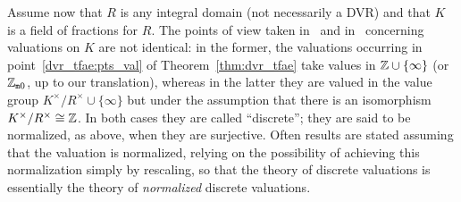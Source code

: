 \documentclass[sigplan,10pt, nonacm, review]{acmart}
\begin{document}
Assume now that $R$ is any integral domain (not necessarily a DVR) and that $K$ is a field of fractions for $R$. The points of view taken in~\cite[Chapitre~I]{Ser62} and in~\cite[Chapitre~VI, \S3, n$^\circ$6]{Bou85} concerning valuations on $K$ are not identical: in the former, the valuations occurring in point~\ref{dvr_tfae:pts_val} of Theorem~\ref{thm:dvr_tfae} take values in $\mathbb{Z}\cup\{\infty\}$ (or $\mathbb{Z}_{\mathtt{m}0}$, up to our translation), whereas in the latter they are valued in the value group $K^\times/R^\times \cup\{\infty\}$ but under the assumption that there is an isomorphism $K^\times/R^\times\cong \mathbb{Z}$. In both cases they are called ``discrete''; they are said to be normalized, as above, when they are surjective. Often results are stated assuming that the valuation is normalized, relying on the possibility of achieving this normalization simply by rescaling, so that the theory of discrete valuations is essentially the theory of \emph{normalized} discrete valuations.
\end{document}
